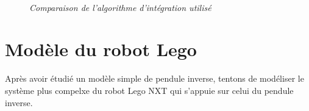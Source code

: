 \documentclass[11pt,french]{article} %
\begin{document}
\begin{figure}[H]%
	\centering
	\noindent{} \\
		\caption{\textit{Comparaison de l'algorithme d'intégration utilisé}}
		\label{fig:courbes_capteurs}%
\end{figure}
\vspace{0.5cm}


\newpage
\section{Modèle du robot Lego}

Après avoir étudié un modèle simple de pendule inverse, tentons de modéliser le système plus compelxe du robot Lego NXT qui s'appuie sur celui du pendule inverse. \\
\end{document}
